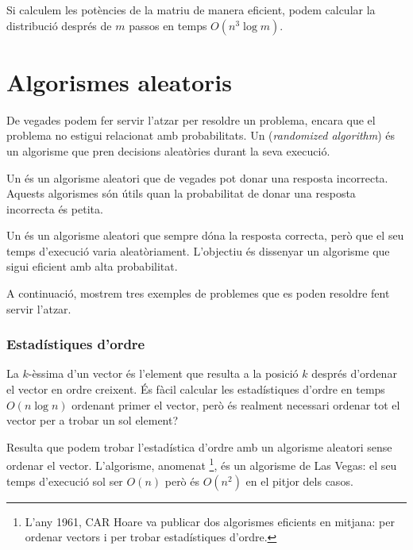 Si calculem les potències de la matriu de manera eficient, podem
calcular la distribució després de $m$ passos en temps $O(n^3 \log
m)$.

\section{Algorismes aleatoris}


De vegades podem fer servir l'atzar per resoldre un problema, encara
que el problema no estigui relacionat amb probabilitats. Un
 (\emph{randomized algorithm}) és un algorisme
que pren decisions aleatòries durant la seva execució.


Un  és un algorisme aleatori que de
vegades pot donar una resposta incorrecta. Aquests algorismes són
útils quan la probabilitat de donar una resposta incorrecta és petita.


Un  és un algorisme aleatori que sempre
dóna la resposta correcta, però que el seu temps d'execució varia
aleatòriament. L'objectiu és dissenyar un algorisme que sigui eficient
amb alta probabilitat.

A continuació, mostrem tres exemples de problemes que es poden
resoldre fent servir l'atzar.

\subsubsection{Estadístiques d'ordre}


La $k$-èssima  d'un vector és l'element que
resulta a la posició $k$ després d'ordenar el vector en ordre
creixent. És fàcil calcular les estadístiques d'ordre en temps $O(n
\log n)$ ordenant primer el vector, però és realment necessari ordenar
tot el vector per a trobar un sol element?

Resulta que podem trobar l'estadística d'ordre amb un algorisme
aleatori sense ordenar el vector. L'algorisme, anomenat
\footnote{L'any 1961, CAR Hoare va publicar dos
algorismes eficients en mitjana:  
 \cite{hoa61a} per ordenar vectors i 
\cite{hoa61b} per trobar estadístiques d'ordre.}, és un algorisme de
Las Vegas: el seu temps d'execució sol ser $O(n)$ però és $O(n^2)$ en
el pitjor dels casos.

